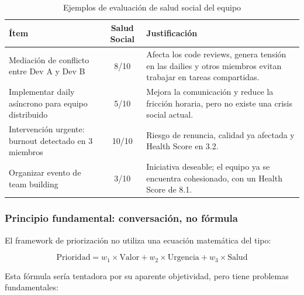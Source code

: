 \begin{table}[h]
    \centering
    \small
    \begin{tabularx}{\textwidth}{|X|c|X|}
        \hline
        \textbf{Ítem} & \textbf{Salud Social}                                                                                          & \textbf{Justificación} \\
        \hline
        Mediación de conflicto entre Dev A y Dev B
                      & 8/10
                      & Afecta los code reviews, genera tensión en las dailies y otros miembros evitan trabajar en tareas compartidas.                          \\
        \hline
        Implementar daily asíncrono para equipo distribuido
                      & 5/10
                      & Mejora la comunicación y reduce la fricción horaria, pero no existe una crisis social actual.                                           \\
        \hline
        Intervención urgente: burnout detectado en 3 miembros
                      & 10/10
                      & Riesgo de renuncia, calidad ya afectada y Health Score en 3.2.                                                                          \\
        \hline
        Organizar evento de team building
                      & 3/10
                      & Iniciativa deseable; el equipo ya se encuentra cohesionado, con un Health Score de 8.1.                                                 \\
        \hline
    \end{tabularx}
    \caption{Ejemplos de evaluación de salud social del equipo}
    \label{tab:ejemplos-salud-social}
\end{table}
\FloatBarrier

\subsubsection{Principio fundamental: conversación, no fórmula}

El framework de priorización no utiliza una ecuación matemática del tipo:

\begin{equation}
    \text{Prioridad} = w_1 \times \text{Valor} + w_2 \times \text{Urgencia} + w_3 \times \text{Salud}
\end{equation}

Esta fórmula sería tentadora por su aparente objetividad, pero tiene problemas fundamentales:

